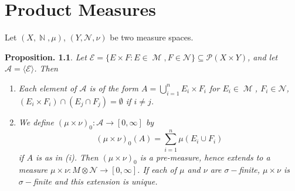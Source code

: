 \documentclass[11pt, a4paper]{memoir}
\DeclareMathOperator{\N}{{\mathbb{N}}}
\theoremstyle{change}
\newtheorem{proposition}[theorem]{Proposition.}
\theoremstyle{plain}
\theoremstyle{nonumberplain}
\DeclareMathOperator{\M}{{\mathcal{M}}}
\numberwithin{equation}{section}
\begin{document}
\chapter{Product Measures}
Let $(X,\N,\mu)$, $(Y,\mathcal{N},\nu)$ be two measure spaces.
\begin{proposition}
    Let $\mathcal{E}=\{E\times F:E\in\M,F\in\mathcal{N}\}\subseteq\mathcal{P}(X\times Y)$, and let $\mathcal{A}=\langle\mathcal{E}\rangle$.
    Then
    \begin{enumerate}[nolistsep]
        \item Each element of $\mathcal{A}$ is of the form $A=\bigcup_{i=1}^n E_i\times F_i$ for $E_i\in\M$, $F_i\in\mathcal{N}$, $(E_i\times F_i)\cap (E_j\cap F_j)=\emptyset$ if $i\neq j$.
        \item We define $(\mu\times\nu)_0:\mathcal{A}\to[0,\infty]$ by
            \begin{equation*}
                (\mu\times\nu)_0(A)=\sum_{i=1}^n\mu(E_i\cup F_i)
            \end{equation*}
            if $A$ is as in (i).
            Then $(\mu\times\nu)_0$ is a pre-measure, hence extends to a measure $\mu\times\nu:M\otimes\mathcal{N}\to[0,\infty]$.
            If each of $\mu$ and $\nu$ are $\sigma-$finite, $\mu\times\nu$ is $\sigma-$finite and this extension is unique.
    \end{enumerate}
\end{proposition}
\end{document}
